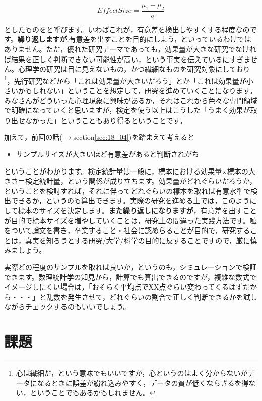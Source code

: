 \documentclass{ltjsarticle}
\begin{document}
\[ EffectSize =  \frac{\mu_1-\mu_2}{\sigma} \]

としたものをと呼びます。いわばこれが，有意差を検出しやすくする程度なのです。\textbf{繰り返しますが},有意差を出すことを目的にしよう，といっているわけではありません。ただ，優れた研究テーマであっても，効果量が大きな研究でなければ結果を正しく判断できない可能性が高い，という事実を伝えているにすぎません。心理学の研究は目に見えないもの，かつ繊細なものを研究対象にしており\footnote{心は繊細だ，という意味でもいいですが，心というのはよく分からないがデータになるときに誤差が紛れ込みやすく，データの質が低くならざるを得ない，ということでもあるかもしれません。}，先行研究などから「これは効果量が大きいだろう」とか「これは効果量が小さいかもしれない」ということを想定して，研究を進めていくことになります。みなさんがどういった心理現象に興味があるか，それはこれから色々な専門領域で明確になっていくと思いますが，検定を使う以上はこうした「うまく効果が取り出せなかった」ということもあり得るということです。

加えて，前回の話($\to$section\ref{sec:18_04})を踏まえて考えると
\begin{itemize}
	\item サンプルサイズが大きいほど有意差があると判断されがち
\end{itemize}
ということがわかります。検定統計量は一般に，標本における効果量$\times$標本の大きさ＝検定統計量，という関係が成り立ちます。効果量がどれぐらいだろうか，ということを検討すれば，それに伴ってどれぐらいの標本を取れば有意水準で検出できるか，というのも算出できます。実際の研究を進める上では，このようにして標本のサイズを決定します。\textbf{また繰り返しになりますが}，有意差を出すことが目的で標本サイズを増やしていくことは，研究上の間違った実践方法です。嘘をついて論文を書き，卒業すること・社会に認めらることが目的で，研究することは，真実を知ろうとする研究/大学/科学の目的に反することですので，厳に慎みましょう。

実際どの程度のサンプルを取れば良いか，というのも，シミュレーションで検証できます。数理統計学の知見から，計算でも算出できるのですが，複雑な数式でイメージしにくい場合は，「おそらく平均点でXX点ぐらい変わってくるはずだから・・・」と乱数を発生させて，どれぐらいの割合で正しく判断できるかを試しながらチェックするのもいいでしょう。
\section{課題}
\end{document}
